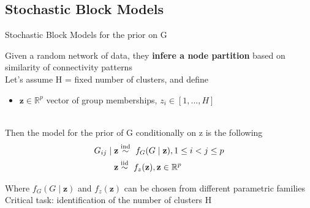 \subsection{Stochastic Block Models}
\begin{frame}{Stochastic Block Models for the prior on G}

Given a random network of data, they \textbf{infere a node partition} based on similarity of connectivity patterns\\

Let's assume H = fixed number of clusters, and define 
\begin{itemize}
    \item $\mathbf{z} \in \mathbb{R}^p$ vector of group memberships, $z_{i} \in [1,...,H]$
 \end{itemize}\\

Then the model for the prior of G conditionally on z is the following
  \begin{align*}
    G_{ij} \mid \mathbf{z} &\ind\  f_{G}(G \mid \mathbf{z}) , 1 \le i < j \le p \\ %
    \mathbf{z} &\iid\ f_{z}(\mathbf{z}), \mathbf{z} \in \mathbb{R}^p
  \end{align*}

  Where $f_{G}(G \mid \mathbf{z})$ and $f_{z}(\mathbf{z})$ can be chosen from different parametric families\\


 Critical task: \alert{identification of the number of clusters H}
\end{frame}







